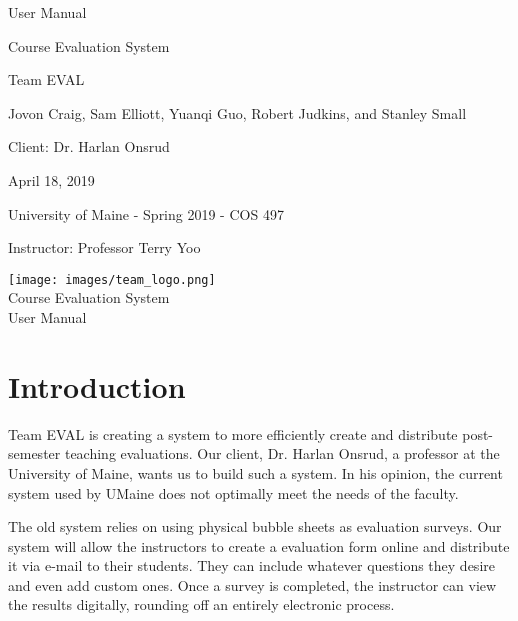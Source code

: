 \documentclass{article}
\begin{document}
\begin{titlepage}

\centering
\vspace*{2cm}
{\Huge User Manual\par}
\vspace{.25cm}
{\LARGE Course Evaluation System\par}
\vspace{1cm}
{\Large Team EVAL\par}
\vspace{.2cm}
{\Large Jovon Craig, Sam Elliott, Yuanqi Guo, Robert Judkins, and Stanley Small\par}
\vspace{1cm}
{\Large Client: Dr. Harlan Onsrud\par}
\vspace{1cm}
{\Large April 18, 2019\par}
\vspace{11cm}

University of Maine - Spring 2019 - COS 497

Instructor: Professor Terry Yoo

\end{titlepage}

\newpage

\begin{center}
{\texttt{[image: images/team\_logo.png]}} \\ 	\bigskip
{\LARGE Course Evaluation System } \\ \medskip
{\large User Manual } \\ \medskip
\end{center}

\tableofcontents

\newpage

\section{Introduction}

Team EVAL is creating a system to more efficiently create and distribute post-semester teaching evaluations. Our client, Dr. Harlan Onsrud, a professor at the University of Maine, wants us to build such a system. In his opinion, the current system used by UMaine does not optimally meet the needs of the faculty.

The old system relies on using physical bubble sheets as evaluation surveys. Our system will allow the instructors to create a evaluation form online and distribute it via e-mail to their students. They can include whatever questions they desire and even add custom ones. Once a survey is completed, the instructor can view the results digitally, rounding off an entirely electronic process.
  
\end{document}
